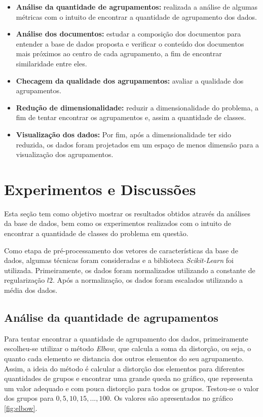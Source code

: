 \documentclass[conference]{IEEEtran}
\begin{document}
\begin{itemize}
	\item \small \textbf{Análise da quantidade de agrupamentos:} realizada a análise de algumas métricas com o intuito de encontrar a quantidade de agrupamento dos dados.

	\item \small \textbf{Análise dos documentos:} estudar a composição dos documentos para entender a base de dados proposta e verificar o conteúdo dos documentos mais próximos ao centro de cada agrupamento, a fim de encontrar similaridade entre eles.

	\item \small \textbf{Checagem da qualidade dos agrupamentos:} avaliar a qualidade dos agrupamentos.

	\item \small \textbf{Redução de dimensionalidade:} reduzir a dimensionalidade do problema, a fim de tentar encontrar os agrupamentos e, assim a quantidade de classes.

	\item \small \textbf{Visualização dos dados:} Por fim, após a dimensionalidade ter sido reduzida, os dados foram projetados em um espaço de menos dimensão para a visualização dos agrupamentos.

\end{itemize}

\section{Experimentos e Discussões} \label{sec:exp}

Esta seção tem como objetivo mostrar os resultados obtidos através da análises da base de dados, bem como os experimentos realizados com o intuito de encontrar a quantidade de classes do problema em questão.

Como etapa de pré-processamento dos vetores de características da base de dados, algumas técnicas foram consideradas e a biblioteca \emph{Scikit-Learn} foi utilizada. Primeiramente, os dados foram normalizados utilizando a constante de regularização $l2$. Após a normalização, os dados foram escalados utilizando a média dos dados.

\subsection{Análise da quantidade de agrupamentos}

Para tentar encontrar a quantidade de agrupamento dos dados, primeiramente escolheu-se utilizar o método \emph{Elbow}, que calcula a soma da distorção, ou seja, o quanto cada elemento se distancia dos outros elementos do seu agrupamento. Assim, a ideia do método é calcular a distorção dos elementos para diferentes quantidades de grupos e encontrar uma grande queda no gráfico, que representa um valor adequado e com pouca distorção para todos os grupos. Testou-se o valor dos grupos para $0, 5, 10, 15, ..., 100$. Os valores são apresentados no gráfico \ref{fig:elbow}.
\end{document}
